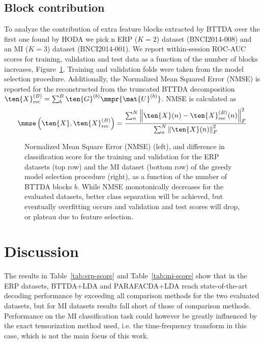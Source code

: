\subsection{Block contribution}
To analyze the contribution of extra feature blocks extracted by {BTTDA} over
the first one found by HODA we pick n ERP ($K=2$) dataset
(BNCI2014-008) and an MI ($K=3$) dataset (BNCI2014-001).
We report within-session ROC-AUC scores for training, validation and test data as a function
of the number of blocks increases, Figure~\ref{fig:blocks}.
Training and validation folds were taken from the model selection procedure.
Additionally, the Normalized Mean Squared Error (NMSE) is reported for the
reconstructed from the truncated BTTDA decomposition
$\textstyle{\ten{X}_\text{rec}^{(B)}=\sum_b^B\ten{G}^{(b)}\mmpr{\mat{U}^{(b)}}}$.
NMSE is calculated as
\begin{equation}
	\nmse\left(\ten{X}, \ten{X}_\text{rec}^{(B)}\right) =
	\frac{\sum_n^N\left\lVert\ten{X}(n)-\ten{X}_\text{rec}^{(B)}(n)\right\rVert_F^2}
	{\sum_n^N\left\lVert\ten{X}(n)\right\rVert_F^2}
\end{equation}
\begin{figure}[t]
	
	\caption{Normalized Mean Square Error (NMSE) (left), and difference in
    classification score for the training and validation for the ERP datasets
    (top row) and the MI dataset (bottom row)	of the greedy model selection
    procedure (right), as a function of the number of BTTDA blocks $b$.
		While NMSE monotonically decreases for the evaluated datasets, better class
		separation will be achieved, but eventually overfitting occurs and validation
		and test scores will drop, or plateau due to feature selection.
	}
	\label{fig:blocks}
\end{figure}


\section{Discussion}
The results in Table~\ref{tab:erp-score} and Table~\ref{tab:mi-score} show that
in the ERP datasets, BTTDA+LDA and PARAFACDA+LDA reach state-of-the-art decoding performance by
exceeding all comparison methods for the two evaluated datasets, but
for MI datasets results fall short of those of comparison methods.
Performance on the MI classification task could however be greatly influenced
by the exact tensorization method used, i.e. the time-frequency transform in
this case, which is not the main focus of this work.

